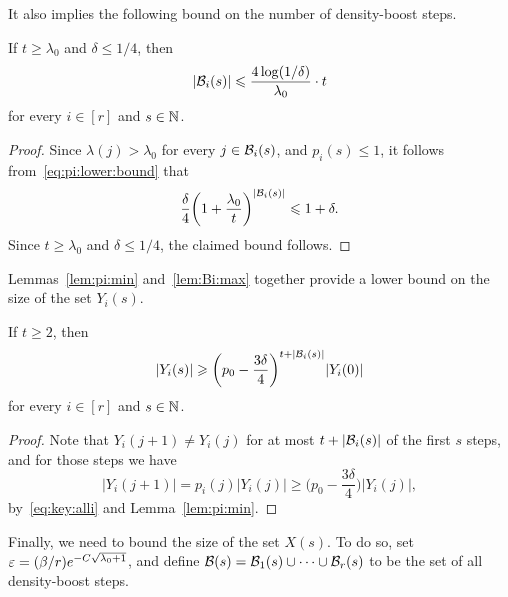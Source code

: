 It also implies the following bound on the number of density-boost steps. 

\begin{lemma}
  \label{lem:Bi:max} %
  If \(t \ge \lambda_0\) and \(\delta \le 1/4\), then
  \begin{equation*}
    |\mathcal{B}_i(s)| \leqslant \frac{4 \log(1/\delta)}{\lambda_0} \cdot t
  \end{equation*}
  for every \(i \in [r]\) and \(s \in \mathbb{N}\). 
\end{lemma}
%
\begin{proof}
  Since \(\lambda(j) > \lambda_0\) for every \(j \in \mathcal{B}_i(s)\), and \(p_i(s) \le 1\), it follows from~\eqref{eq:pi:lower:bound} that
  \begin{equation*}
    \frac{\delta}{4} \bigg( 1 + \frac{\lambda_0}{t} \bigg)^{|\mathcal{B}_i(s)|} \leqslant 1 + \delta.
  \end{equation*}
  Since \(t \ge \lambda_0\) and \(\delta \le 1/4\), the claimed bound follows. 
\end{proof}

Lemmas~\ref{lem:pi:min} and~\ref{lem:Bi:max} together provide a lower bound on the size of the set \(Y_i(s)\). 

\begin{lemma}
  \label{lem:Y:lower:bound} %
  If \(t \ge 2\), then
  \begin{equation*}
    |Y_i(s)| \geqslant \bigg( p_0 - \frac{3\delta}{4} \bigg)^{t + |\mathcal{B}_i(s)|} |Y_i(0)|
  \end{equation*}
  for every \(i \in [r]\) and \(s \in \mathbb{N}\). 
\end{lemma}
%
\begin{proof}
  Note that \(Y_i(j+1) \ne Y_i(j)\) for at most \(t + |\mathcal{B}_i(s)|\) of the first \(s\) steps, and for those steps we have
  \begin{equation*}
    |Y_i(j+1)| = p_i(j) |Y_i(j)| \ge \bigg( p_0 - \frac{3\delta}{4} \bigg) |Y_i(j)|,
  \end{equation*}
  by~\eqref{eq:key:alli} and Lemma~\ref{lem:pi:min}.
\end{proof}

Finally, we need to bound the size of the set \(X(s)\). To do so, set \(\varepsilon = (\beta / r) e^{- C \sqrt{\lambda_0 + 1}}\), and define \(\mathcal{B}(s) = \mathcal{B}_1(s) \cup \cdots \cup \mathcal{B}_r(s)\) to be the set of all density-boost steps. 

